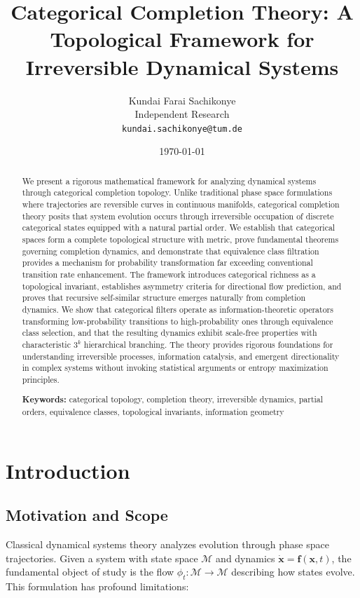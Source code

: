 \documentclass[12pt,a4paper]{article}
\title{\textbf{Categorical Completion Theory: A Topological Framework for Irreversible Dynamical Systems}}
\author{
Kundai Farai Sachikonye\\
Independent Research\\
\texttt{kundai.sachikonye@tum.de}
}
\date{\today}
\begin{document}
\maketitle

\begin{abstract}
We present a rigorous mathematical framework for analyzing dynamical systems through categorical completion topology. Unlike traditional phase space formulations where trajectories are reversible curves in continuous manifolds, categorical completion theory posits that system evolution occurs through irreversible occupation of discrete categorical states equipped with a natural partial order. We establish that categorical spaces form a complete topological structure with metric, prove fundamental theorems governing completion dynamics, and demonstrate that equivalence class filtration provides a mechanism for probability transformation far exceeding conventional transition rate enhancement. The framework introduces categorical richness as a topological invariant, establishes asymmetry criteria for directional flow prediction, and proves that recursive self-similar structure emerges naturally from completion dynamics. We show that categorical filters operate as information-theoretic operators transforming low-probability transitions to high-probability ones through equivalence class selection, and that the resulting dynamics exhibit scale-free properties with characteristic $3^k$ hierarchical branching. The theory provides rigorous foundations for understanding irreversible processes, information catalysis, and emergent directionality in complex systems without invoking statistical arguments or entropy maximization principles.

\textbf{Keywords:} categorical topology, completion theory, irreversible dynamics, partial orders, equivalence classes, topological invariants, information geometry
\end{abstract}

\tableofcontents

\section{Introduction}

\subsection{Motivation and Scope}

Classical dynamical systems theory analyzes evolution through phase space trajectories. Given a system with state space $\mathcal{M}$ and dynamics $\dot{\mathbf{x}} = \mathbf{f}(\mathbf{x}, t)$, the fundamental object of study is the flow $\phi_t: \mathcal{M} \to \mathcal{M}$ describing how states evolve. This formulation has profound limitations:
\end{document}
